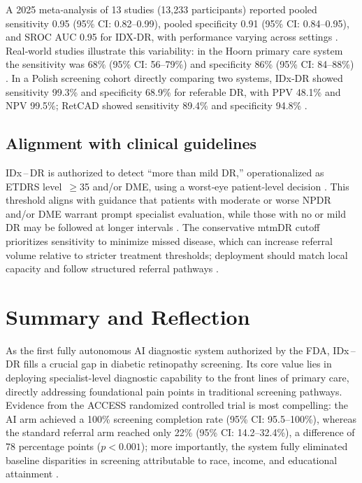 \documentclass[sigconf]{acmart}
\begin{document}
A 2025 meta‐analysis of 13 studies (13{,}233 participants) reported pooled sensitivity 0.95 (95\% CI: 0.82–0.99), pooled specificity 0.91 (95\% CI: 0.84–0.95), and SROC AUC 0.95 for IDX‐DR, with performance varying across settings \citep{Khan2025AJO}. Real‐world studies illustrate this variability: in the Hoorn primary care system the sensitivity was 68\% (95\% CI: 56–79\%) and specificity 86\% (95\% CI: 84–88\%) \citep{vanderHeijden2018Hoorn}. In a Polish screening cohort directly comparing two systems, IDx‐DR showed sensitivity 99.3\% and specificity 68.9\% for referable DR, with PPV 48.1\% and NPV 99.5\%; RetCAD showed sensitivity 89.4\% and specificity 94.8\% \citep{Grzybowski2025OphTher}.

\subsection{Alignment with clinical guidelines}

IDx\textsuperscript{\textregistered}\,–\,DR is authorized to detect “more than mild DR,” operationalized as ETDRS level~$\geq$35 and/or DME, using a worst‐eye patient‐level decision \citep{FDA2018DEN180001,Abramoff2018Pivotal}. This threshold aligns with guidance that patients with moderate or worse NPDR and/or DME warrant prompt specialist evaluation, while those with no or mild DR may be followed at longer intervals \citep{ADA2025S12}. The conservative mtmDR cutoff prioritizes sensitivity to minimize missed disease, which can increase referral volume relative to stricter treatment thresholds; deployment should match local capacity and follow structured referral pathways \citep{ADA2025S12,FDA2018DEN180001}.

\section{Summary and Reflection}

As the first fully autonomous AI diagnostic system authorized by the FDA, IDx\textsuperscript{\textregistered}\,–\,DR fills a crucial gap in diabetic retinopathy screening. Its core value lies in deploying specialist\mbox{-}level diagnostic capability to the front lines of primary care, directly addressing foundational pain points in traditional screening pathways. Evidence from the ACCESS randomized controlled trial is most compelling: the AI arm achieved a 100\% screening completion rate (95\% CI: 95.5–100\%), whereas the standard referral arm reached only 22\% (95\% CI: 14.2–32.4\%), a difference of 78 percentage points (\(p < 0.001\)); more importantly, the system fully eliminated baseline disparities in screening attributable to race, income, and educational attainment \citep{Wolf2024NatCommun}.
\end{document}
